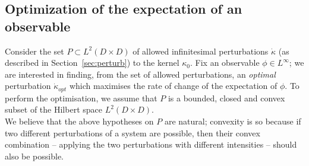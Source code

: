 \documentclass{amsart}
\begin{document}
 \subsection{Optimization of the expectation of an observable} \label{sec:opt_exp} 
Consider the set \(P\subset L^2(D\times D)\) of allowed infinitesimal perturbations $\dot{\kappa}$ (as described in Section~\ref{sec:perturb}) to the kernel $\kappa_0$. Fix an observable $\phi\in L^\infty$; we are interested in finding, from the set of allowed perturbations, an \emph{optimal} perturbation $\dot{\kappa}_{opt}$ which maximises the rate of change of the expectation of \(\phi\). To perform the optimisation, we assume that \(P\) is a bounded, closed and convex subset of the Hilbert space \( L^2(D\times D)\). \\
We believe that the above hypotheses on \(P\) are natural; convexity is so because if two different perturbations of a system are possible, then their convex combination -- applying the two perturbations with different intensities -- should also be possible.\\
\end{document}
